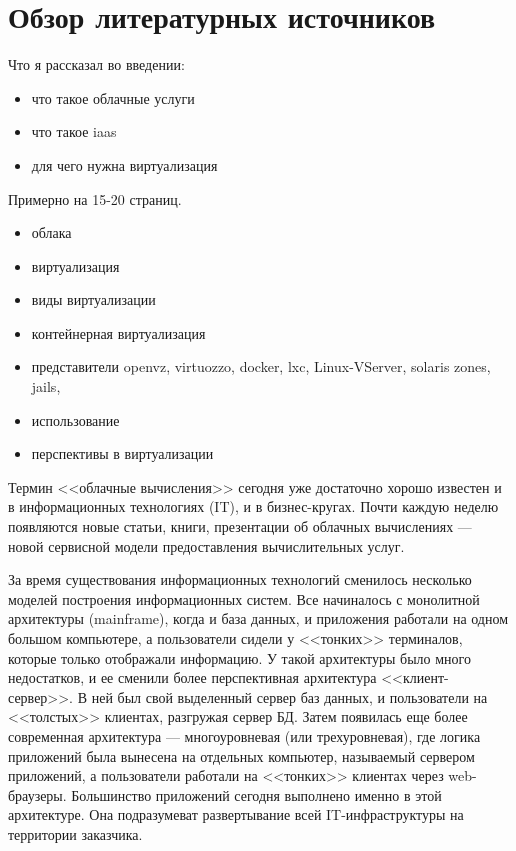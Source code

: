 \section{Обзор литературных источников}

Что я рассказал во введении:
\begin{itemize}
  \item что такое облачные услуги
  \item что такое iaas
  \item для чего нужна виртуализация
\end{itemize}


Примерно на 15-20 страниц.
\begin{itemize}
  \item облака
  \item виртуализация
  \item виды виртуализации
  \item контейнерная виртуализация
  \item представители openvz, virtuozzo, docker, lxc, Linux-VServer, solaris zones, jails, 
  \item использование
  \item перспективы в виртуализации
\end{itemize}

Термин <<облачные вычисления>> сегодня уже достаточно хорошо известен и в информационных технологиях (IT), и в бизнес-кругах.
Почти каждую неделю появляются новые статьи, книги, презентации об облачных вычислениях --- новой сервисной модели предоставления вычислительных услуг.

За время существования информационных технологий сменилось несколько моделей построения информационных систем.
Все начиналось с монолитной архитектуры (mainframe), когда и база данных, и приложения работали на одном большом компьютере, а пользователи сидели у <<тонких>> терминалов, которые только отображали информацию.
У такой архитектуры было много недостатков, и ее сменили более перспективная архитектура <<клиент-сервер>>.
В ней был свой выделенный сервер баз данных, и пользователи на <<толстых>> клиентах, разгружая сервер БД.
Затем появилась еще более современная архитектура --- многоуровневая (или трехуровневая), где логика приложений была вынесена на отдельных компьютер, называемый сервером приложений, а пользователи работали на <<тонких>> клиентах через web-браузеры.
Большинство приложений сегодня выполнено именно в этой архитектуре.
Она подразумеват развертывание всей IT-инфраструктуры на территории заказчика.

